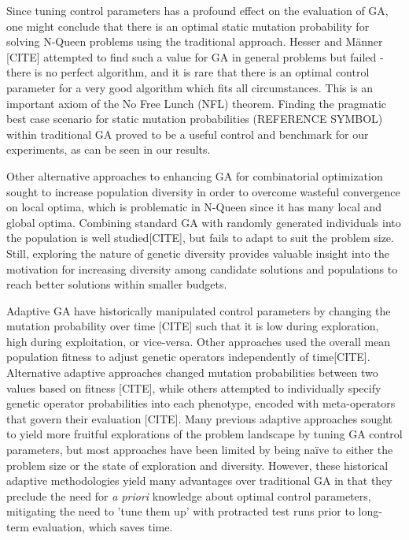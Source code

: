 \documentclass[conference]{IEEEtran}
\begin{document}
Since tuning control parameters has a profound effect on the evaluation of GA, one might conclude that there is an optimal static mutation probability for solving N-Queen problems using the traditional approach. Hesser and M\"{a}nner [CITE] attempted to find such a value for GA in general problems but failed - there is no perfect algorithm, and it is rare that there is an optimal control parameter for a very good algorithm which fits all circumstances. This is an important axiom of the No Free Lunch (NFL) theorem. Finding the pragmatic best case scenario for static mutation probabilities ({REFERENCE SYMBOL}) within traditional GA proved to be a useful control and benchmark for our experiments, as can be seen in our results.

Other alternative approaches to enhancing GA for combinatorial optimization sought to increase population diversity in order to overcome wasteful convergence on local optima, which is problematic in N-Queen since it has many local and global optima. Combining standard GA with randomly generated individuals into the population is well studied[CITE], but fails to adapt to suit the problem size. Still, exploring the nature of genetic diversity provides valuable insight into the motivation for increasing diversity among candidate solutions and populations to reach better solutions within smaller budgets.

Adaptive GA have historically manipulated control parameters by changing the mutation probability over time [CITE] such that it is low during exploration, high during exploitation, or vice-versa. Other approaches used the overall mean population fitness to adjust genetic operators independently of time[CITE]. Alternative adaptive approaches changed mutation probabilities between two values based on fitness [CITE], while others attempted to individually specify genetic operator probabilities into each phenotype, encoded with meta-operators that govern their evaluation [CITE]. Many previous adaptive approaches sought to yield more fruitful explorations of the problem landscape by tuning GA control parameters, but most approaches have been limited by being na\"{i}ve to either the problem size or the state of exploration and diversity. However, these historical adaptive methodologies yield many advantages over traditional GA in that they preclude the need for \textit{a priori} knowledge about optimal control parameters, mitigating the need to 'tune them up' with protracted test runs prior to long-term evaluation, which saves time.
\end{document}
